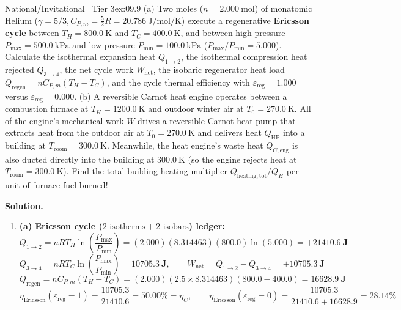 \begin{workedexample}{National/Invitational \textbar\ Tier 3}{ex:09.9}
(a) Two moles ($n = \SI{2.000}{\mole}$) of monatomic Helium ($\gamma = 5/3, C_{P,m} = \frac{5}{2}R = \SI{20.786}{\joule\per\mole\per\kelvin}$) execute a regenerative \textbf{Ericsson cycle} between $T_H = \SI{800.0}{\kelvin}$ and $T_C = \SI{400.0}{\kelvin}$, and between high pressure $P_{\max} = \SI{500.0}{\kilo\pascal}$ and low pressure $P_{\min} = \SI{100.0}{\kilo\pascal}$ ($P_{\max}/P_{\min} = 5.000$). Calculate the isothermal expansion heat $Q_{1\to 2}$, the isothermal compression heat rejected $Q_{3\to 4}$, the net cycle work $W_{\mathrm{net}}$, the isobaric regenerator heat load $Q_{\mathrm{regen}} = nC_{P,m}(T_H - T_C)$, and the cycle thermal efficiency with $\varepsilon_{\mathrm{reg}} = 1.000$ versus $\varepsilon_{\mathrm{reg}} = 0.000$.
(b) A reversible Carnot heat engine operates between a combustion furnace at $T_H = \SI{1200.0}{\kelvin}$ and outdoor winter air at $T_0 = \SI{270.0}{\kelvin}$. All of the engine's mechanical work $W$ drives a reversible Carnot heat pump that extracts heat from the outdoor air at $T_0 = \SI{270.0}{\kelvin}$ and delivers heat $Q_{\mathrm{HP}}$ into a building at $T_{\mathrm{room}} = \SI{300.0}{\kelvin}$. Meanwhile, the heat engine's waste heat $Q_{C,\mathrm{eng}}$ is also ducted directly into the building at $\SI{300.0}{\kelvin}$ (so the engine rejects heat at $T_{\mathrm{room}} = \SI{300.0}{\kelvin}$). Find the total building heating multiplier $Q_{\mathrm{heating,tot}} / Q_H$ per unit of furnace fuel burned!
\par\smallskip\noindent
\textbf{Solution.}
\begin{enumerate}
  \item \textbf{(a) Ericsson cycle ($2\text{ isotherms} + 2\text{ isobars}$) ledger:}
  \[
    Q_{1\to 2} = nRT_H\ln\left(\frac{P_{\max}}{P_{\min}}\right) = (2.000)(8.314463)(800.0)\ln(5.000) = \mathbf{+\SI{21410.6}{\joule}}
  \]
  \[
    Q_{3\to 4} = nRT_C\ln\left(\frac{P_{\max}}{P_{\min}}\right) = \mathbf{\SI{10705.3}{\joule}}, \qquad W_{\mathrm{net}} = Q_{1\to 2} - Q_{3\to 4} = \mathbf{+\SI{10705.3}{\joule}}
  \]
  \[
    Q_{\mathrm{regen}} = nC_{P,m}(T_H - T_C) = (2.000)(2.5\times 8.314463)(800.0 - 400.0) = \mathbf{\SI{16628.9}{\joule}}
  \]
  \[
    \eta_{\mathrm{Ericsson}}(\varepsilon_{\mathrm{reg}}=1) = \frac{10705.3}{21410.6} = \mathbf{50.00\%} = \eta_C, \qquad \eta_{\mathrm{Ericsson}}(\varepsilon_{\mathrm{reg}}=0) = \frac{10705.3}{21410.6 + 16628.9} = \mathbf{28.14\%}
\]
\end{enumerate}
\end{workedexample}
